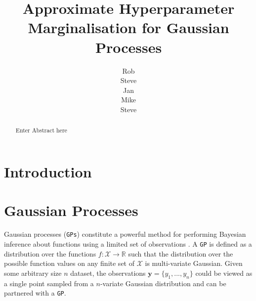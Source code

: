 \documentclass{article}
\title{Approximate Hyperparameter Marginalisation for Gaussian Processes}
\author{
Rob\\
\And
Steve\\
\And
Jan\\
\And
Mike\\
\And
Steve\\}
\begin{document}
\maketitle

\begin{abstract}
Enter Abstract here
\end{abstract}


\section{Introduction}



\section{Gaussian Processes}

Gaussian processes (\verb"GPs") constitute a powerful method for performing Bayesian inference about functions using a limited set of observations \cite{rassandwill}. A \verb"GP" is defined as a distribution over the functions $f : \mathcal{X} \rightarrow \mathbb{R}$ such that the distribution over the possible function values on any finite set of $\mathcal{X}$ is multi-variate Gaussian. Given some arbitrary size $n$ dataset, the observations $\mathbf{y} = \{ y_1,...,y_n\}$ could be viewed as a single point sampled from a $n$-variate Gaussian distribution and can be partnered with a \verb"GP".
\end{document}
